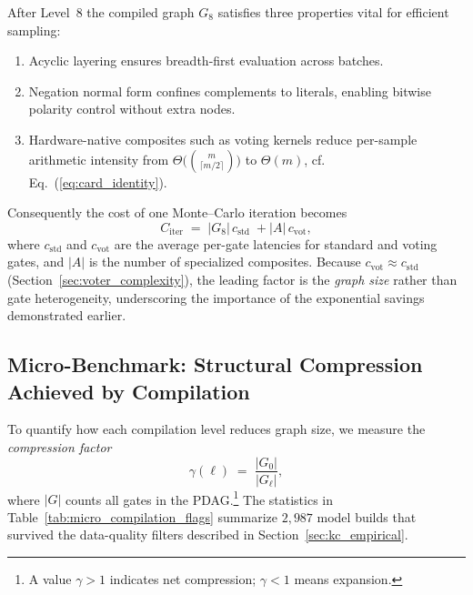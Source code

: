 After Level~8 the compiled graph $G_{8}$ satisfies three properties vital for efficient sampling:
\begin{enumerate}[label=(\alph*)]
  \item {Acyclic layering} ensures breadth-first evaluation across
        batches.
  \item {Negation normal form} confines complements to literals,
        enabling bitwise polarity control without extra nodes.
  \item {Hardware-native composites} such as voting kernels reduce
        per-sample arithmetic intensity from
        $\Theta\!\bigl(\binom{m}{\lceil m/2 \rceil}\bigr)$ to
        $\Theta(m)$, cf. Eq.~(\ref{eq:card_identity}).
\end{enumerate}
Consequently the cost of one Monte–Carlo iteration becomes
\[
  C_{\mathrm{iter}} \;=\; |G_{8}|\,c_{\text{std}}\;+
  |A|\,c_{\text{vot}},
\]
where $c_{\text{std}}$ and $c_{\text{vot}}$ are the average per-gate
latencies for standard and voting gates, and $|A|$ is the number of
specialized composites.  Because $c_{\text{vot}}\approx c_{\text{std}}$
(Section~\ref{sec:voter_complexity}), the leading factor is the
\emph{graph size} rather than gate heterogeneity, underscoring the
importance of the exponential savings demonstrated earlier.


\subsection{Micro-Benchmark: Structural Compression Achieved by Compilation}
\label{sec:kc_microbenchmark}

To quantify how each compilation level reduces graph size, we measure
the \emph{compression factor}
\[
  \gamma(\ell)\;=\;
  \frac{|G_0|}{|G_\ell|},
\]
where $|G|$ counts all gates in the PDAG.\footnote{%
  A value $\gamma>1$ indicates net compression;
  $\gamma<1$ means expansion.}
The statistics in Table~\ref{tab:micro_compilation_flags}
summarize $2{,}987$ model builds that survived the data-quality
filters described in Section~\ref{sec:kc_empirical}.

